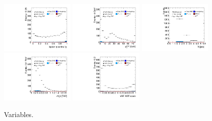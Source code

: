 \begin{figure}[tp]
  \includegraphics[width=0.32\textwidth]{figures/antitaus/lep-eta-centrality}
  \includegraphics[width=0.32\textwidth]{figures/antitaus/system-pt}
  \includegraphics[width=0.32\textwidth]{figures/antitaus/n-jets30}
  \includegraphics[width=0.32\textwidth]{figures/antitaus/dijet-m-veryhigh}
  \includegraphics[width=0.32\textwidth]{figures/antitaus/BDTEve-VBF}
  \caption{Variables.}
  \label{fig:backgrounds-antitaus-jets}
\end{figure}

\clearpage


